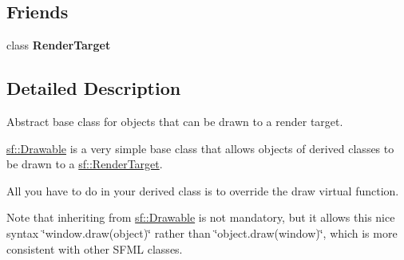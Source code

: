 \subsection*{Friends}
\begin{DoxyCompactItemize}
\item 
\mbox{\label{classsf_1_1_drawable_aa5afc6f82b7b587ed5ada4d227ce32aa}} 
class {\bfseries Render\+Target}
\end{DoxyCompactItemize}


\subsection{Detailed Description}
Abstract base class for objects that can be drawn to a render target. 

\begin{DoxyVerb}\end{DoxyVerb}


\mbox{\hyperlink{classsf_1_1_drawable}{sf\+::\+Drawable}} is a very simple base class that allows objects of derived classes to be drawn to a \mbox{\hyperlink{classsf_1_1_render_target}{sf\+::\+Render\+Target}}.

All you have to do in your derived class is to override the draw virtual function.

Note that inheriting from \mbox{\hyperlink{classsf_1_1_drawable}{sf\+::\+Drawable}} is not mandatory, but it allows this nice syntax \char`\"{}window.\+draw(object)\char`\"{} rather than \char`\"{}object.\+draw(window)\char`\"{}, which is more consistent with other S\+F\+ML classes.

